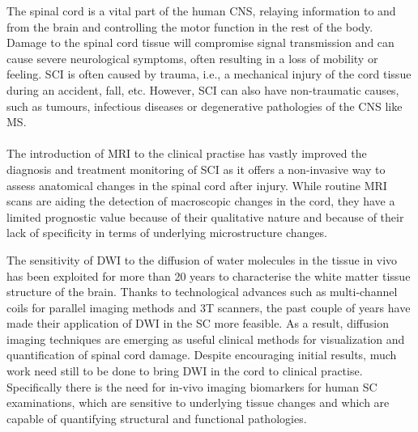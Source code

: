 The spinal cord is a vital part of the human \gls{CNS}, relaying information to and from the brain and controlling the motor function in the rest of the body. Damage to the spinal cord tissue will compromise signal transmission and can cause severe neurological symptoms, often resulting in a loss of mobility or feeling. \Gls{SCI} is often caused by trauma, i.e., a mechanical injury of the cord tissue during an accident, fall, etc. However, \gls{SCI} can also have non-traumatic causes, such as tumours, infectious diseases or degenerative pathologies of the \gls{CNS} like \gls{MS}.
\paragraph{}
The introduction of \gls{MRI} to the clinical practise has vastly improved the diagnosis and treatment monitoring of \gls{SCI} as it offers a non-invasive way to assess anatomical changes in the spinal cord after injury. While routine \gls{MRI} scans are aiding the detection of macroscopic changes in the cord, they have a limited prognostic value because of their qualitative nature and because of their lack of specificity in terms of underlying microstructure changes. 

The sensitivity of {\gls{DWI}} to the diffusion of water molecules in the tissue in vivo has been exploited for more than 20 years to characterise the white matter tissue structure of the brain. Thanks to technological advances such as multi-channel coils for parallel imaging methods and 3T scanners, the past couple of years have made their application of \gls{DWI} in the {\gls{SC}} more feasible. As a result, diffusion imaging techniques are emerging as useful clinical methods for visualization and quantification of spinal cord damage. Despite encouraging initial results, much work need still to be done to bring \gls{DWI} in the cord to clinical practise. Specifically there is the need for in-vivo imaging biomarkers for human {\gls{SC}} examinations, which are sensitive to underlying tissue changes and which are capable of quantifying structural and functional pathologies.





